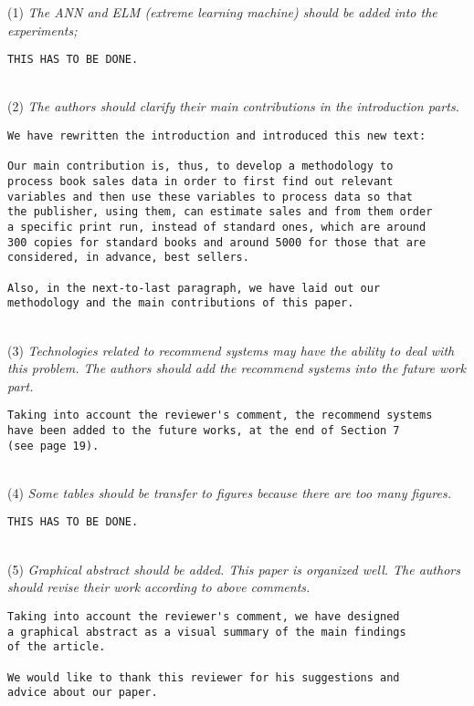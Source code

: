 \documentclass[preprint]{elsarticle}
\begin{document}
\noindent (1) \emph{The ANN and ELM (extreme learning machine) should be added into the experiments; } 

\begin{verbatim}
THIS HAS TO BE DONE.
\end{verbatim}

~\\
\noindent (2) \emph{The authors should clarify their main contributions in the introduction parts.}

\begin{verbatim}
We have rewritten the introduction and introduced this new text:

Our main contribution is, thus, to develop a methodology to 
process book sales data in order to first find out relevant 
variables and then use these variables to process data so that 
the publisher, using them, can estimate sales and from them order 
a specific print run, instead of standard ones, which are around 
300 copies for standard books and around 5000 for those that are 
considered, in advance, best sellers.

Also, in the next-to-last paragraph, we have laid out our 
methodology and the main contributions of this paper.
\end{verbatim}

~\\
\noindent (3) \emph{Technologies related to recommend systems may have the ability to deal with this problem. The authors should add the recommend systems into the future work part. } 

\begin{verbatim}
Taking into account the reviewer's comment, the recommend systems
have been added to the future works, at the end of Section 7 
(see page 19).
\end{verbatim}

~\\
\noindent (4) \emph{Some tables should be transfer to figures because there are too many figures. } 

\begin{verbatim}
THIS HAS TO BE DONE.
\end{verbatim}

~\\
\noindent (5) \emph{Graphical abstract should be added. This paper is organized well. The authors should revise their work according to above comments. } 

\begin{verbatim}
Taking into account the reviewer's comment, we have designed 
a graphical abstract as a visual summary of the main findings 
of the article.

We would like to thank this reviewer for his suggestions and 
advice about our paper.
\end{verbatim}
\end{document}
